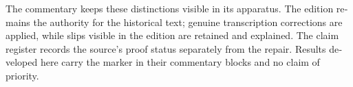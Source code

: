 \begin{otherlanguage}{english}
The commentary keeps these distinctions visible in its apparatus. The edition remains the authority for the historical text; genuine transcription corrections are applied, while slips visible in the edition are retained and explained. The claim register records the source's proof status separately from the repair. Results developed here carry the marker \ours{} in their commentary blocks and no claim of priority.
\end{otherlanguage}
\dgrchunkend
